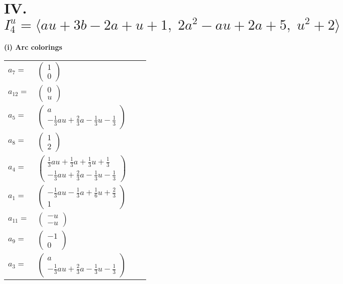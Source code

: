 \documentclass[1p]{elsarticle_modified}
\theoremstyle{definition}
\begin{document}
\centering \section*{IV. $I^u_{4}= \langle a u+3 b-2 a+u+1,\;2 a^2- a u+2 a+5,\;u^2+2 \rangle$}
\flushleft \textbf{(i) Arc colorings}\\
\begin{tabular}{m{7pt} m{180pt} m{7pt} m{180pt} }
\flushright $a_{7}=$&$\begin{pmatrix}1\\0\end{pmatrix}$ \\
\flushright $a_{12}=$&$\begin{pmatrix}0\\u\end{pmatrix}$ \\
\flushright $a_{5}=$&$\begin{pmatrix}a\\-\frac{1}{3} a u+\frac{2}{3} a-\frac{1}{3} u-\frac{1}{3}\end{pmatrix}$ \\
\flushright $a_{8}=$&$\begin{pmatrix}1\\2\end{pmatrix}$ \\
\flushright $a_{4}=$&$\begin{pmatrix}\frac{1}{3} a u+\frac{1}{3} a+\frac{1}{3} u+\frac{1}{3}\\-\frac{1}{3} a u+\frac{2}{3} a-\frac{1}{3} u-\frac{1}{3}\end{pmatrix}$ \\
\flushright $a_{1}=$&$\begin{pmatrix}-\frac{1}{3} a u-\frac{1}{3} a+\frac{1}{6} u+\frac{2}{3}\\1\end{pmatrix}$ \\
\flushright $a_{11}=$&$\begin{pmatrix}- u\\- u\end{pmatrix}$ \\
\flushright $a_{9}=$&$\begin{pmatrix}-1\\0\end{pmatrix}$ \\
\flushright $a_{3}=$&$\begin{pmatrix}a\\-\frac{1}{3} a u+\frac{2}{3} a-\frac{1}{3} u-\frac{1}{3}\end{pmatrix}$ \\

\end{tabular}
\end{document}
